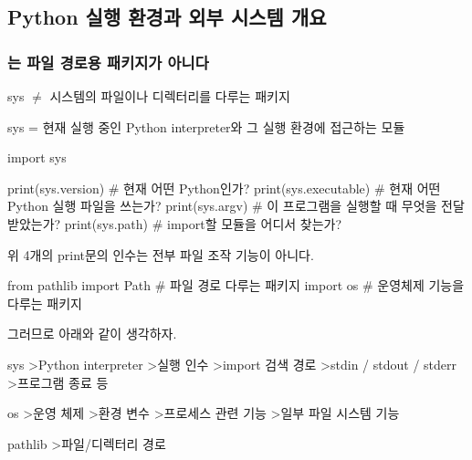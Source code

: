 

\subsection{Python 실행 환경과 외부 시스템 개요}

\subsubsection{는 파일 경로용 패키지가 아니다}

\begin{dhknote}
\begin{dhksmry}
sys $\neq$ 시스템의 파일이나 디렉터리를 다루는 패키지

sys = 현재 실행 중인 Python interpreter와 
      그 실행 환경에 접근하는 모듈
\end{dhksmry}
\end{dhknote}

\begin{dhkcode}
import sys

print(sys.version) # 현재 어떤 Python인가? 
print(sys.executable) # 현재 어떤 Python 실행 파일을 쓰는가?
print(sys.argv) # 이 프로그램을 실행할 때 무엇을 전달받았는가?
print(sys.path) # import할 모듈을 어디서 찾는가?
\end{dhkcode}

위 4개의 print문의 인수는 전부 파일 조작 기능이 아니다.

\begin{dhkcode}
from pathlib import Path # 파일 경로 다루는 패키지
import os # 운영체제 기능을 다루는 패키지
\end{dhkcode}

그러므로 아래와 같이 생각하자.

\begin{dhkdir}
sys
>Python interpreter
>실행 인수
>import 검색 경로
>stdin / stdout / stderr
>프로그램 종료 등
\end{dhkdir}

\begin{dhkdir}
os
>운영 체제
>환경 변수
>프로세스 관련 기능
>일부 파일 시스템 기능
\end{dhkdir}

\begin{dhkdir}
pathlib
>파일/디렉터리 경로
\end{dhkdir}

